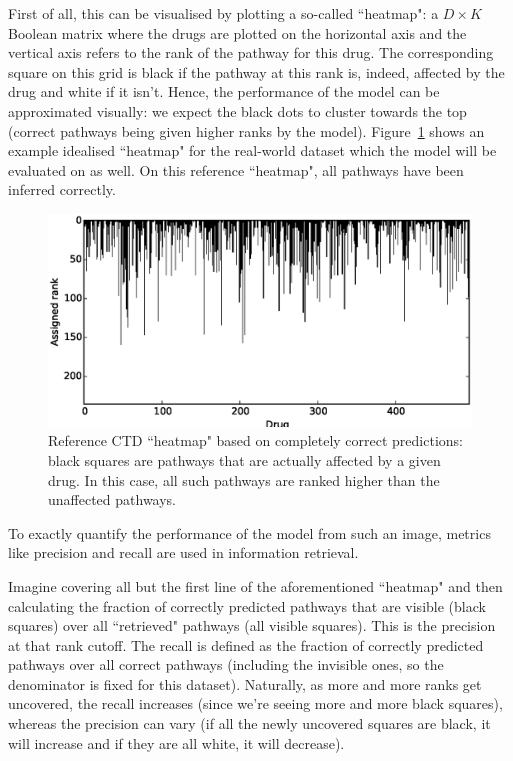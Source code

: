 \documentclass[12pt,a4paper,twoside,openright]{report}
\begin{document}
First of all, this can be visualised by plotting a so-called ``heatmap": a $D \times K$ Boolean matrix where the drugs are plotted on the horizontal axis and the vertical axis refers to the rank of the pathway for this drug. The corresponding square on this grid is black if the pathway at this rank is, indeed, affected by the drug and white if it isn't. Hence, the performance of the model can be approximated visually: we expect the black dots to cluster towards the top (correct pathways being given higher ranks by the model). Figure~\ref{fig:ref-ctd-heatmap} shows an example idealised ``heatmap" for the real-world dataset which the model will be evaluated on as well. On this reference ``heatmap", all pathways have been inferred correctly.

\begin{figure}[!htb]
\includegraphics[width=\textwidth]{ref-ctd-heatmap.eps}
\caption{Reference CTD ``heatmap" based on completely correct predictions: black squares are pathways that are actually affected by a given drug. In this case, all such pathways are ranked higher than the unaffected pathways.}
\label{fig:ref-ctd-heatmap}
\end{figure}

To exactly quantify the performance of the model from such an image, metrics like precision and recall are used in information retrieval. 

Imagine covering all but the first line of the aforementioned ``heatmap" and then calculating the fraction of correctly predicted pathways that are visible (black squares) over all ``retrieved" pathways (all visible squares). This is the precision at that rank cutoff. The recall is defined as the fraction of correctly predicted pathways over all correct pathways (including the invisible ones, so the denominator is fixed for this dataset). Naturally, as more and more ranks get uncovered, the recall increases (since we're seeing more and more black squares), whereas the precision can vary (if all the newly uncovered squares are black, it will increase and if they are all white, it will decrease).
\end{document}
